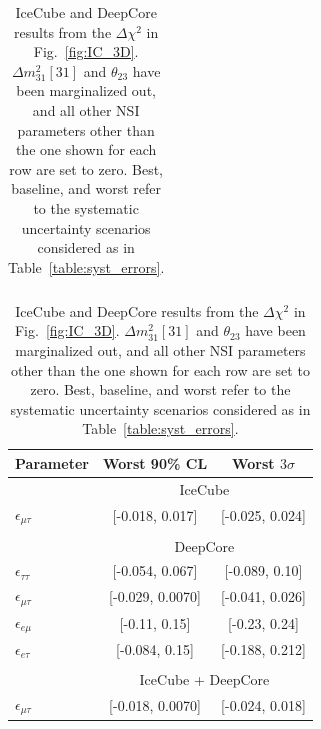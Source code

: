 \documentclass{revtex4-2}
\newcommand{\emt}{\ensuremath{\epsilon_{\mu\tau}}}
\newcommand{\eet}{\epsilon_{e\tau}}
\newcommand{\eem}{\epsilon_{e\mu}}
\newcommand{\ett}{\ensuremath{\epsilon_{\tau\tau}}}
\newcommand{\dm}{\Delta m^2_{31}}
\begin{document}
{{\begin{table}
\begin{center}
\begin{tabular}{lcc}
       \end{tabular}
       \begin{tabular}{lcc}
          \hline
          Parameter & Worst 90\% CL & Worst $3\sigma$\\
          \hline & \multicolumn{2}{c}{IceCube}  \\
          $\emt$ &  [-0.018, 0.017] &  [-0.025, 0.024] \\\\
          & \multicolumn{2}{c}{DeepCore}\\ [0.3em]
          $\ett$ &  [-0.054, 0.067] &  [-0.089, 0.10] \\
          $\emt$ &  [-0.029, 0.0070] &  [-0.041, 0.026] \\
          $\eem$ &  [-0.11, 0.15] &  [-0.23, 0.24] \\
          $\eet$ &   [-0.084, 0.15] &  [-0.188, 0.212] \\\\
          &\multicolumn{2}{c}{IceCube + DeepCore}\\
          $\emt$ &  [-0.018, 0.0070] &  [-0.024, 0.018] \\
          \hline
       \end{tabular}
       \caption{IceCube and DeepCore results from the $\Delta \chi^2$ in Fig.~\ref{fig:IC_3D}. $\dm[31]$ and $\theta_{23}$ have been marginalized out, and all other NSI parameters other than the one shown for each row are set to zero. Best, baseline, and worst refer to 
       the systematic uncertainty scenarios considered as in Table~\ref{table:syst_errors}.}\label{table:IC_DC_results}
    \end{center}
 \end{table}
 
}}
\end{document}
